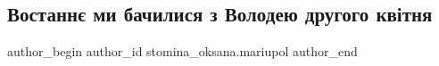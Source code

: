  
 
 
 
 

\subsection{Востаннє ми бачилися з Володею другого квітня}
\label{sec:26_02_2023.fb.stomina_oksana.mariupol.1.vostann__mi_bachilis}

\ifcmt
 author_begin
   author_id stomina_oksana.mariupol
 author_end
\fi
